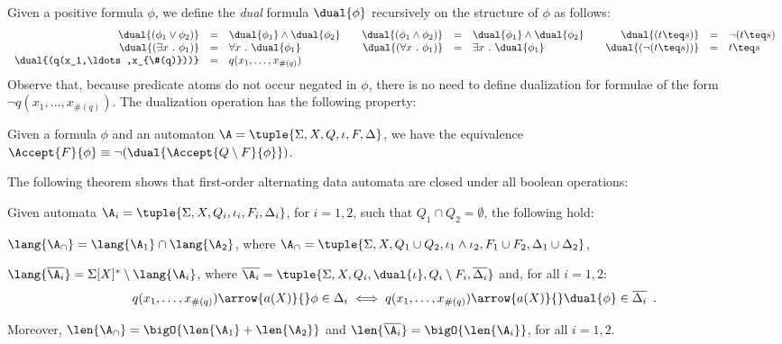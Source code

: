\documentclass{llncs}
\begin{document}
Given a positive formula $\phi$, we define the \emph{dual} formula
$\dual{\phi}$ recursively on the structure of $\phi$ as follows: 
\[\begin{array}{rclcrclcrcl}
\dual{(\phi_1 \vee \phi_2)} & = & \dual{\phi_1} \wedge \dual{\phi_2} && 
\dual{(\phi_1 \wedge \phi_2)} & = & \dual{\phi_1} \wedge \dual{\phi_2} &&
\dual{(t \teq s)} & = & \neg(t \teq s) \\
\dual{(\exists x ~.~ \phi_1)} & = & \forall x ~.~ \dual{\phi_1} && 
\dual{(\forall x ~.~ \phi_1)} & = & \exists x ~.~ \dual{\phi_1} && 
\dual{(\neg(t \teq s))} & = & t \teq s \\
\dual{(q(x_1,\ldots,x_{\#(q)}))} & = & q(x_1,\ldots,x_{\#(q)})
\end{array}\]
Observe that, because predicate atoms do not occur negated in $\phi$,
there is no need to define dualization for formulae of the form $\neg
q(x_1,\ldots,x_{\#(q)})$. The dualization operation has the following
property:
\begin{lemma}\label{lemma:dual}
  Given a formula $\phi$ and an automaton
  $\A=\tuple{\Sigma,X,Q,\iota,F,\Delta}$, we have the equivalence
  $\Accept{F}{\phi} \equiv \neg(\dual{\Accept{Q\setminus F}{\phi}})$. 
\end{lemma}

The following theorem shows that first-order alternating data automata
are closed under all boolean operations: 

\begin{theorem}\label{thm:closure}
  Given automata $\A_i = \tuple{\Sigma,X,Q_i,\iota_i,F_i,\Delta_i}$,
  for $i=1,2$, such that $Q_1 \cap Q_2 = \emptyset$, the following hold: 
  \begin{compactitem}
    \item\label{it1:closure} $\lang{\A_\cap} = \lang{\A_1} \cap \lang{\A_2}$, where
      $\A_\cap = \tuple{\Sigma,X,Q_1 \cup Q_2, \iota_1 \wedge \iota_2,
      F_1 \cup F_2, \Delta_1 \cup \Delta_2}$, 
    \item\label{it2:closure} $\lang{\overline{\A_i}} = \Sigma[X]^* \setminus
      \lang{\A_i}$, where $\overline{\A_i} =
      \tuple{\Sigma,X,Q_i,\dual{\iota},Q_i\setminus
        F_i,\overline{\Delta_i}}$ and, for all
      $i=1,2$: \[q(x_1,\ldots,x_{\#(q)}) \arrow{a(X)}{} \phi \in
      \Delta_i \iff q(x_1,\ldots,x_{\#(q)}) \arrow{a(X)}{} \dual{\phi}
      \in \overline{\Delta_i} \enspace.\]
  \end{compactitem}
  Moreover, $\len{\A_\cap} = \bigO{\len{\A_1}+\len{\A_2}}$ and
  $\len{\overline{\A_i}} = \bigO{\len{\A_i}}$, for all $i=1,2$.
\end{theorem}
\proof{\qed}

 

\end{document}
